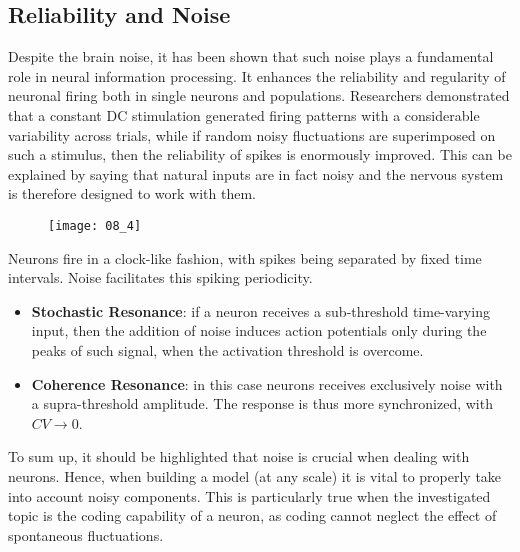 \subsection{Reliability and Noise}
Despite the brain noise, it has been shown that such noise plays a fundamental role in neural
information processing. It enhances the reliability and regularity of neuronal firing both
in single neurons and populations. Researchers demonstrated that a constant DC stimulation
generated firing patterns with a considerable variability across trials, while if random
noisy fluctuations are superimposed on such a stimulus, then the reliability of spikes
is enormously improved. This can be explained by saying that natural inputs are in fact noisy
and the nervous system is therefore designed to work with them.
\begin{figure}[H]
    \texttt{[image: 08\_4]}
    \centering
\end{figure}
Neurons fire in a clock-like fashion, with spikes being separated by fixed time intervals.
Noise facilitates this spiking periodicity.
\begin{itemize}
    \item \textbf{Stochastic Resonance}: if a neuron receives a sub-threshold time-varying input,
          then the addition of noise induces action potentials only during the peaks of such signal,
          when the activation threshold is overcome.
    \item \textbf{Coherence Resonance}: in this case neurons receives exclusively noise with a
          supra-threshold amplitude. The response is thus more synchronized, with \(CV\to{0}\).
\end{itemize}
To sum up, it should be highlighted that noise is crucial when dealing with neurons. Hence,
when building a model (at any scale) it is vital to properly take into account noisy
components. This is particularly true when the investigated topic is the coding capability of
a neuron, as coding cannot neglect the effect of spontaneous fluctuations.